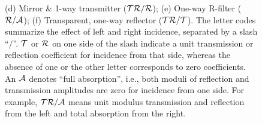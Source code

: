 \begin{figure}
{  (d) Mirror \& 1-way transmitter ($\cal{TR/R}$); (e) One-way R-filter ($\cal{R/A}$); (f) Transparent, one-way
  reflector ($\cal{TR/T}$).
  The letter codes summarize the effect of left and right incidence, separated by a  slash ``$/$''.
  ${\cal T}$ or ${\cal R}$ on one side of the slash indicate a unit
  transmission or reflection coefficient
  for  incidence from that side, whereas the absence of one or the other letter corresponds to zero coefficients.
  An ${\cal A}$ denotes ``full absorption'', i.e., both moduli of reflection and transmission amplitudes are zero for incidence from one side.
  For example,  $\cal{TR/A}$ means unit modulus transmission
  and reflection from the left and total absorption from the right.
  \label{cases}}
\end{figure}



